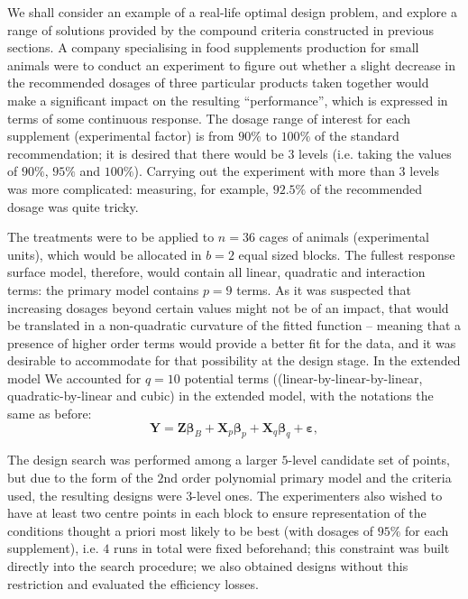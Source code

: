 We shall consider an example of a real-life optimal design problem, and explore a range of solutions provided by the compound criteria constructed in previous sections.
A company specialising in food supplements production for small animals were to conduct an experiment to figure out whether a slight decrease in the recommended dosages of three particular products taken together would make a significant impact on the resulting ``performance'', which is expressed in terms of some continuous response. The dosage range of interest for each supplement (experimental factor) is from $90\%$ to $100\%$ of the standard recommendation; it is desired that there would be $3$ levels (i.e. taking the values of $90\%$, $95\%$ and $100\%$). Carrying out the experiment with more than $3$ levels was more complicated: measuring, for example, $92.5\%$ of the recommended dosage was quite tricky. 

The treatments were to be applied to $n = 36$ cages of animals (experimental units), which would be allocated in $b=2$ equal sized blocks. The fullest response surface model, therefore, would contain all linear, quadratic and interaction terms: the primary model contains $p=9$ terms. As it was suspected that increasing dosages beyond certain values might not be of an impact, that would be translated in a non-quadratic curvature of the fitted function -- meaning that a presence of higher order terms would provide a better fit for the data, and it was desirable to accommodate for that possibility at the design stage. In the extended model We accounted for $q=10$ potential terms ((linear-by-linear-by-linear, quadratic-by-linear and cubic) in the extended model, with the notations the same as before:
\begin{equation*}
\bm{Y}=\bm{Z\beta}_{B}+\bm{X}_{p}\bm{\beta}_{p}+\bm{X}_{q}\bm{\beta}_{q}+\bm{\varepsilon},
\end{equation*}

The design search was performed among a larger $5$-level candidate set of points, but due to the form of the $2$nd order polynomial primary model and the criteria used, the resulting designs were $3$-level ones. The experimenters also wished to have at least two centre points in each block to ensure representation of the conditions thought a priori most likely to be best (with dosages of $95\%$ for each supplement), i.e. $4$ runs in total were fixed beforehand; this constraint was built directly into the search procedure; we also obtained designs without this restriction and evaluated the efficiency losses.


